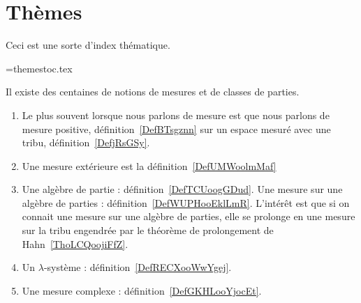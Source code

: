 
\section*{Thèmes}

Ceci est une sorte d'index thématique.



\begin{multicols}{2}
\noindent

\end{multicols}

\newwrite\themetoc
\immediate\openout\themetoc=themestoc.tex





  \label{INTooVDSCooHXLLKp}
    Il existe des centaines de notions de mesures et de classes de parties.
\begin{enumerate}
        \item
            Le plus souvent lorsque nous parlons de mesure est que nous parlons de mesure positive, définition~\ref{DefBTsgznn} sur un espace mesuré avec une tribu, définition~\ref{DefjRsGSy}.
        \item
            Une mesure extérieure est la définition~\ref{DefUMWoolmMaf}
        \item
            Une algèbre de partie : définition~\ref{DefTCUoogGDud}. Une mesure sur une algèbre de parties : définition~\ref{DefWUPHooEklLmR}. L'intérêt est que si on connait une mesure sur une algèbre de parties, elle se prolonge en une mesure sur la tribu engendrée par le théorème de prolongement de Hahn~\ref{ThoLCQoojiFfZ}.
        \item
            Un \( \lambda\)-système : définition~\ref{DefRECXooWwYgej}.
        \item
            Une mesure complexe : définition~\ref{DefGKHLooYjocEt}.
\end{enumerate}

